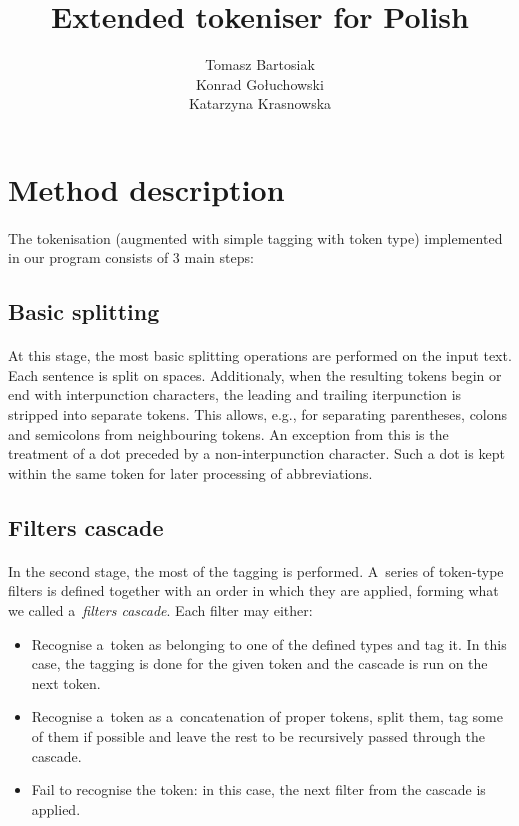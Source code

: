 \documentclass[oneside,12pt]{article}
\title{Extended tokeniser for Polish}
\author{Tomasz Bartosiak \\ Konrad Gołuchowski \\ Katarzyna Krasnowska}
\begin{document}
\maketitle

\section{Method description}

\paragraph{}
The tokenisation (augmented with simple tagging with token type) implemented in our program consists of 3 main steps:

\subsection{Basic splitting}

\paragraph{}
At this stage, the most basic splitting operations are performed on the input text. Each sentence is split on spaces. Additionaly, when the resulting tokens begin or end with interpunction characters, the leading and trailing iterpunction is stripped into separate tokens. This allows, e.g., for separating parentheses, colons and semicolons from neighbouring tokens. An exception from this is the treatment of a dot preceded by a non-interpunction character. Such a dot is kept within the same token for later processing of abbreviations.

\subsection{Filters cascade}

\paragraph{}
In the second stage, the most of the tagging is performed. A~series of token-type filters is defined together with an order in which they are applied, forming what we called a~\textit{filters cascade}. Each filter may either:
    \begin{itemize}
        \item Recognise a~token as belonging to one of the defined types and tag it. In this case, the tagging is done for the given token and the cascade is run on the next token.
        \item Recognise a~token as a~concatenation of proper tokens, split them, tag some of them if possible and leave the rest to be recursively passed through the cascade.
        \item Fail to recognise the token: in this case, the next filter from the cascade is applied.
    \end{itemize}
\end{document}
